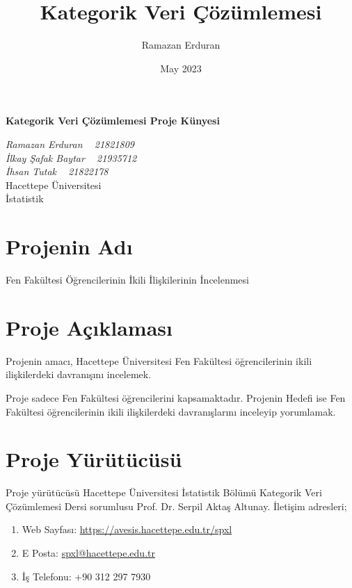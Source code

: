 \documentclass{article}
\title{Kategorik Veri Çözümlemesi}
\author{Ramazan Erduran}
\date{May 2023}
\begin{document}
\begin{titlepage}
    \begin{center}        
        \vspace*{1cm}
        \Huge
        \textbf{Kategorik Veri Çözümlemesi Proje Künyesi}

        \vfill
        
        \Large
        \textit{Ramazan Erduran ~ 21821809 \\
        İlkay Şafak Baytar ~ 21935712 \\
        İhsan Tutak ~ 21822178
        }\\
        
        \vspace{50pt}
        Hacettepe Üniversitesi \\
        İstatistik \\
        
    \end{center}
\end{titlepage}

\newpage
\section{Projenin Adı}
Fen Fakültesi Öğrencilerinin İkili İlişkilerinin İncelenmesi

\section{Proje Açıklaması}
Projenin amacı, Hacettepe Üniversitesi Fen Fakültesi öğrencilerinin ikili ilişkilerdeki davranışını incelemek.

Proje sadece Fen Fakültesi öğrencilerini kapsamaktadır. Projenin Hedefi ise Fen Fakültesi öğrencilerinin ikili ilişkilerdeki davranışlarını inceleyip yorumlamak.

\section{Proje Yürütücüsü}
Proje yürütücüsü Hacettepe Üniversitesi İstatistik Bölümü Kategorik Veri Çözümlemesi Dersi sorumlusu Prof. Dr. Serpil Aktaş Altunay. İletişim adresleri;
\begin{enumerate}
    \item Web Sayfası: \href{https://avesis.hacettepe.edu.tr/spxl}{https://avesis.hacettepe.edu.tr/spxl}
    \item E Posta: \href{mailto:spxl@hacettepe.edu.tr}{spxl@hacettepe.edu.tr}
    \item İş Telefonu: +90 312 297 7930
\end{enumerate}
\end{document}
